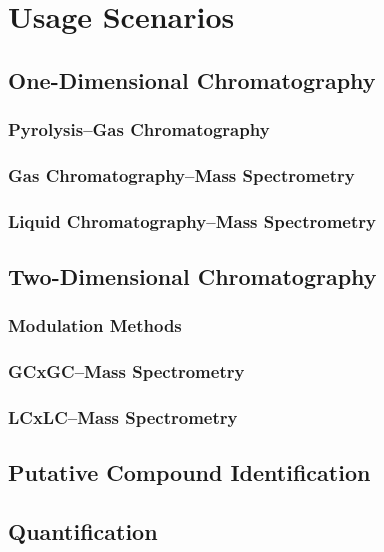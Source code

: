 \chapter{Usage Scenarios}

\section{One-Dimensional Chromatography}

\subsection{Pyrolysis--Gas Chromatography}

\subsection{Gas Chromatography--Mass Spectrometry}

\subsection{Liquid Chromatography--Mass Spectrometry}

\section{Two-Dimensional Chromatography}

\subsection{Modulation Methods}

\subsection{GCxGC--Mass Spectrometry}

\subsection{LCxLC--Mass Spectrometry}

\section{Putative Compound Identification}

\section{Quantification}